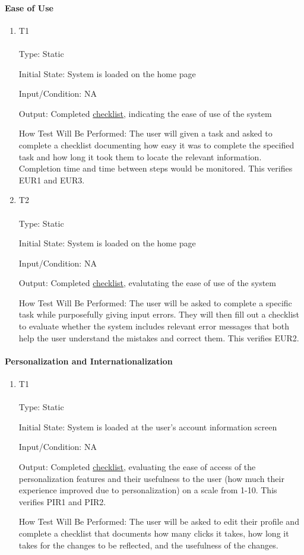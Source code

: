 \documentclass[12pt, titlepage]{article}
\begin{document}
\paragraph{Ease of Use}
\begin{enumerate}
\item {T1\\}\\
\hypertarget{NFR11.1-TC1}{}
Type: Static

Initial State: System is loaded on the home page

Input/Condition: NA

Output: Completed \hyperlink{checklist-nfr11}{checklist}, indicating the ease of use of the system

How Test Will Be Performed: The user will given a task and asked to complete a checklist documenting how easy it was to complete the specified task and how long it took them to locate the relevant information. Completion time and time between steps would be monitored. This verifies EUR1 and EUR3.
\item {T2\\}\\
\hypertarget{NFR11.1-TC2}{}
Type: Static

Initial State: System is loaded on the home page

Input/Condition: NA

Output: Completed \hyperlink{checklist-nfr11}{checklist}, evalutating the ease of use of the system

How Test Will Be Performed: The user will be asked to complete a specific task while purposefully giving input errors. They will then fill out a checklist to evaluate whether the system includes relevant error messages that both help the user understand the mistakes and correct them. This verifies EUR2.
\end{enumerate}
\paragraph{Personalization and Internationalization}
\begin{enumerate}
\item {T1\\}\\
\hypertarget{NFR11.2-TC1}{}
Type: Static

Initial State: System is loaded at the user's account information screen

Input/Condition: NA

Output: Completed \hyperlink{checklist-nfr11}{checklist}, evaluating the ease of access of the personalization features and their usefulness to the user (how much their experience improved due to personalization) on a scale from 1-10. This verifies PIR1 and PIR2.

How Test Will Be Performed: The user will be asked to edit their profile and complete a checklist that documents how many clicks it takes, how long it takes for the changes to be reflected, and the usefulness of the changes.
\end{enumerate}
\end{document}
